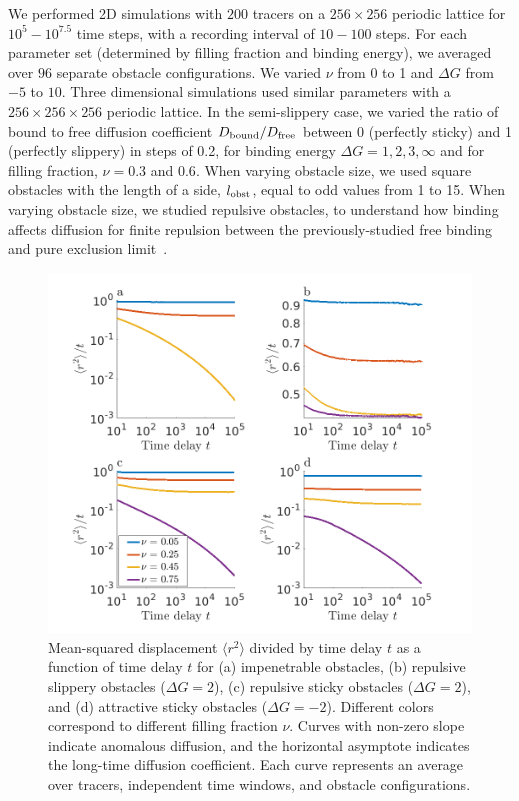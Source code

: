We performed 2D simulations with $ 200 $ tracers on a $ 256 \times 256 $
periodic lattice for $ 10^{5} - 10^{7.5} $ time steps, with a recording interval
of $ 10 - 100 $ steps. For each parameter set (determined by filling fraction
and binding energy), we averaged over $ 96 $ separate obstacle configurations.
We varied $\nu$ from 0 to 1 and $\Delta G$ from $-5$ to $10$. Three dimensional
simulations used similar parameters with a $ 256 \times 256 \times 256$ periodic
lattice. In the semi-slippery case, we varied the ratio of bound to free
diffusion coefficient $D_{\rm bound}/D_{\rm free}$ between 0 (perfectly sticky)
and 1 (perfectly slippery) in steps of 0.2, for binding energy $\Delta G = 1, 2,
3, \infty$ and for filling fraction, $ \nu = 0.3 $ and $ 0.6 $.  When varying
obstacle size, we used square obstacles with the length of a side, $l_{\rm
  obst}$, equal to odd values from 1 to 15. When varying obstacle size, we
studied repulsive obstacles, to understand how binding affects diffusion for
finite repulsion between the previously-studied free binding and pure exclusion
limit~\cite{nicolau_sources_07, ellery_characterizing_14}.

\begin{figure}[!hb]
  \begin{center}
    \includegraphics[width=150mm]{figs/ch02_soft/soft_msd_curves.png}
  \end{center}
  \caption[MSD curves]
	  {Mean-squared displacement $\langle r^2 \rangle$ divided by
    time delay $t$ as a function of time delay $ t $ for (a) impenetrable
    obstacles, (b) repulsive slippery obstacles ($ \Delta G = 2 $),
    (c) repulsive sticky obstacles ($ \Delta G = 2 $), and (d)
    attractive sticky obstacles ($ \Delta G = -2 $). Different colors
    correspond to different filling fraction $\nu$. Curves with
    non-zero slope indicate anomalous diffusion, and the horizontal
    asymptote indicates the long-time diffusion coefficient. Each
    curve represents an average over tracers, independent time
    windows, and obstacle configurations.}\label{fig:msd_curves}
\end{figure}


